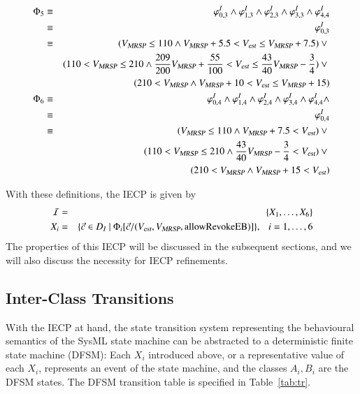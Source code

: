 \begin{eqnarray*}
\Phi_5 & \equiv & \varphi_{0,3}^I \wedge \varphi_{1,3}^I \wedge  \varphi_{2,3}^I \wedge \varphi_{3,3}^I \wedge \varphi_{4,4}^I 
\\ & \equiv & \varphi_{0,3}^I 
\\ & \equiv & ({V_{\text{\sl MRSP}}} \le 110 \wedge {V_{\text{\sl MRSP}}} + 5.5 < {V_{\text{\sl est}}} \le  {V_{\text{\sl MRSP}}} + 7.5) \vee {}
\\ & & (110<{V_{\text{\sl MRSP}}} \le 210 \wedge \frac{209}{200}{V_{\text{\sl MRSP}}} +\frac{55}{100}< {V_{\text{\sl est}}} \le  \frac{43}{40}{V_{\text{\sl MRSP}}} -\frac{3}{4}) \vee {}
\\ & & (210<{V_{\text{\sl MRSP}}}   \wedge {V_{\text{\sl MRSP}}} +10 < {V_{\text{\sl est}}} \le  {V_{\text{\sl MRSP}}} +15)
\\
\Phi_6 & \equiv & \varphi_{0,4}^I \wedge \varphi_{1,4}^I \wedge \varphi_{2,4}^I \wedge \varphi_{3,4}^I \wedge \varphi_{4,4}^I \wedge
\\ &\equiv & \varphi_{0,4}^I
\\ &\equiv & ({V_{\text{\sl MRSP}}} \le 110 \wedge {V_{\text{\sl MRSP}}} + 7.5 < {V_{\text{\sl est}}} ) \vee {}
\\ & & (110<{V_{\text{\sl MRSP}}} \le 210 \wedge  \frac{43}{40}{V_{\text{\sl MRSP}}} -\frac{3}{4}< {V_{\text{\sl est}}} ) \vee {}
\\ & & (210<{V_{\text{\sl MRSP}}}   \wedge {V_{\text{\sl MRSP}}} +15 < {V_{\text{\sl est}}} )
\end{eqnarray*}


With these definitions, the IECP is given by
\begin{eqnarray}
{\cal I} & = & \{ X_1,\dots,X_6  \}
\\
X_i & = & \{\vec c\in D_I~|~\Phi_i[\vec c/({V_{\text{\sl est}}},{V_{\text{\sl MRSP}}},\text{allowRevokeEB})]\},\ \ \ i = 1,\dots,6
\end{eqnarray}
The properties of this IECP will be discussed in the subsequent sections, and we will also discuss the necessity for IECP refinements.
 
\subsection{Inter-Class Transitions}

With the IECP at hand, the state transition system representing the behavioural semantics of the SysML state machine can be abstracted to a deterministic finite  state machine (DFSM): Each $X_i$ introduced above, or a representative value of each $X_i$, represents an event of the state machine, and the classes $A_i, B_i$ are the  DFSM states. The  DFSM transition table is specified in Table~\ref{tab:tr}.


